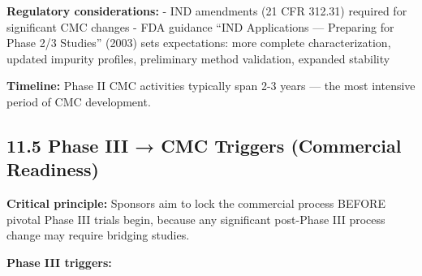 \documentclass[
  11pt,
  a4paper,
]{report}
\begin{document}
\textbf{Regulatory considerations:} - IND amendments (21 CFR 312.31)
required for significant CMC changes - FDA guidance ``IND Applications
--- Preparing for Phase 2/3 Studies'' (2003) sets expectations: more
complete characterization, updated impurity profiles, preliminary method
validation, expanded stability

\textbf{Timeline:} Phase II CMC activities typically span 2-3 years ---
the most intensive period of CMC development.

\hypertarget{phase-iii-cmc-triggers-commercial-readiness}{%
\subsection{11.5 Phase III → CMC Triggers (Commercial
Readiness)}\label{phase-iii-cmc-triggers-commercial-readiness}}

\textbf{Critical principle:} Sponsors aim to lock the commercial process
BEFORE pivotal Phase III trials begin, because any significant
post-Phase III process change may require bridging studies.

\textbf{Phase III triggers:}
\end{document}

